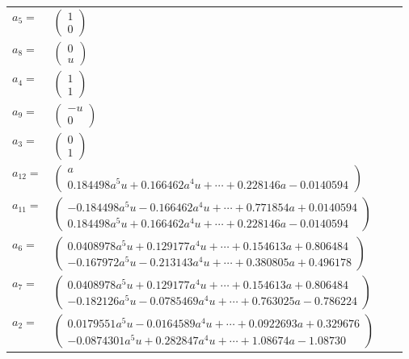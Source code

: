 \documentclass[1p]{elsarticle_modified}
\theoremstyle{definition}
\begin{document}
\begin{tabular}{m{7pt} m{180pt} m{7pt} m{180pt} }
\flushright $a_{5}=$&$\begin{pmatrix}1\\0\end{pmatrix}$ \\
\flushright $a_{8}=$&$\begin{pmatrix}0\\u\end{pmatrix}$ \\
\flushright $a_{4}=$&$\begin{pmatrix}1\\1\end{pmatrix}$ \\
\flushright $a_{9}=$&$\begin{pmatrix}- u\\0\end{pmatrix}$ \\
\flushright $a_{3}=$&$\begin{pmatrix}0\\1\end{pmatrix}$ \\
\flushright $a_{12}=$&$\begin{pmatrix}a\\0.184498 a^{5} u+0.166462 a^{4} u+\cdots+0.228146 a-0.0140594\end{pmatrix}$ \\
\flushright $a_{11}=$&$\begin{pmatrix}-0.184498 a^{5} u-0.166462 a^{4} u+\cdots+0.771854 a+0.0140594\\0.184498 a^{5} u+0.166462 a^{4} u+\cdots+0.228146 a-0.0140594\end{pmatrix}$ \\
\flushright $a_{6}=$&$\begin{pmatrix}0.0408978 a^{5} u+0.129177 a^{4} u+\cdots+0.154613 a+0.806484\\-0.167972 a^{5} u-0.213143 a^{4} u+\cdots+0.380805 a+0.496178\end{pmatrix}$ \\
\flushright $a_{7}=$&$\begin{pmatrix}0.0408978 a^{5} u+0.129177 a^{4} u+\cdots+0.154613 a+0.806484\\-0.182126 a^{5} u-0.0785469 a^{4} u+\cdots+0.763025 a-0.786224\end{pmatrix}$ \\
\flushright $a_{2}=$&$\begin{pmatrix}0.0179551 a^{5} u-0.0164589 a^{4} u+\cdots+0.0922693 a+0.329676\\-0.0874301 a^{5} u+0.282847 a^{4} u+\cdots+1.08674 a-1.08730\end{pmatrix}$ \\

\end{tabular}
\end{document}

